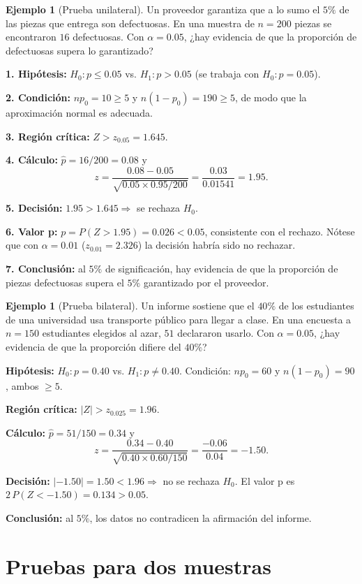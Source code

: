 \documentclass[11pt,a4paper]{article}
\theoremstyle{plain}
\theoremstyle{definition}
\newtheorem{ejemplo}[teorema]{Ejemplo}
\theoremstyle{remark}
\begin{document}
\begin{ejemplo}[Prueba unilateral]
Un proveedor garantiza que a lo sumo el $5\%$ de las piezas que entrega son defectuosas. En una muestra de $n=200$ piezas se encontraron $16$ defectuosas. Con $\alpha=0.05$, ¿hay evidencia de que la proporción de defectuosas supera lo garantizado?

\textbf{1. Hipótesis:} $H_0:p\le0.05$ vs. $H_1:p>0.05$ (se trabaja con $H_0:p=0.05$).

\textbf{2. Condición:} $np_0=10\ge5$ y $n(1-p_0)=190\ge5$, de modo que la aproximación normal es adecuada.

\textbf{3. Región crítica:} $Z>z_{0.05}=1.645$.

\textbf{4. Cálculo:} $\hat p=16/200=0.08$ y
\[
z=\frac{0.08-0.05}{\sqrt{0.05\times0.95/200}}=\frac{0.03}{0.01541}=1.95.
\]

\textbf{5. Decisión:} $1.95>1.645\Rightarrow$ se rechaza $H_0$.

\textbf{6. Valor p:} $p=P(Z>1.95)=0.026<0.05$, consistente con el rechazo. Nótese que con $\alpha=0.01$ ($z_{0.01}=2.326$) la decisión habría sido no rechazar.

\textbf{7. Conclusión:} al $5\%$ de significación, hay evidencia de que la proporción de piezas defectuosas supera el $5\%$ garantizado por el proveedor.
\end{ejemplo}

\begin{ejemplo}[Prueba bilateral]
Un informe sostiene que el $40\%$ de los estudiantes de una universidad usa transporte público para llegar a clase. En una encuesta a $n=150$ estudiantes elegidos al azar, $51$ declararon usarlo. Con $\alpha=0.05$, ¿hay evidencia de que la proporción difiere del $40\%$?

\textbf{Hipótesis:} $H_0:p=0.40$ vs. $H_1:p\neq0.40$. Condición: $np_0=60$ y $n(1-p_0)=90$, ambos $\ge5$.

\textbf{Región crítica:} $|Z|>z_{0.025}=1.96$.

\textbf{Cálculo:} $\hat p=51/150=0.34$ y
\[
z=\frac{0.34-0.40}{\sqrt{0.40\times0.60/150}}=\frac{-0.06}{0.04}=-1.50.
\]

\textbf{Decisión:} $|-1.50|=1.50<1.96\Rightarrow$ no se rechaza $H_0$. El valor p es $2\,P(Z<-1.50)=0.134>0.05$.

\textbf{Conclusión:} al $5\%$, los datos no contradicen la afirmación del informe.
\end{ejemplo}

\newpage
\section{Pruebas para dos muestras}
\end{document}
